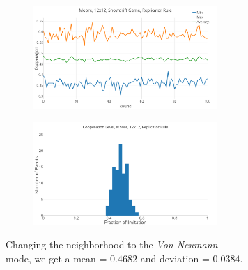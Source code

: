 \documentclass[a4paper, 11pt]{article}
\begin{document}
\begin{figure}[H]
\begin{subfigure}{.55\textwidth}
	\begin{subfigure}{1\textwidth}
		\includegraphics[width=1\linewidth]{SDMoore12x12}
	\end{subfigure}

	\begin{subfigure}{1\textwidth}
		\includegraphics[width=1\linewidth]{SDMoore12x12HG}
	\end{subfigure}
\end{subfigure}%
\begin{subfigure}{.45\textwidth}
	Changing the neighborhood to the \textit{Von Neumann} mode, we get a mean = $0.4682$ and deviation = $0.0384$.
\end{subfigure}

\end{figure}




\newpage
\end{document}
